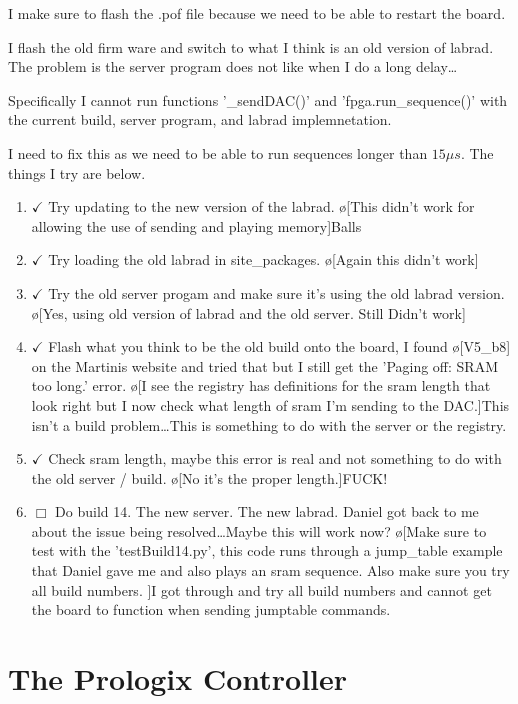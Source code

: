 \documentclass[10pt]{book}
\begin{document}
{I make sure to flash the .pof file because we need to be able to restart the board.

I flash the old firm ware and switch to what I think is an old version of labrad. The problem is the server program does not like when I do a long delay\ldots

Specifically I cannot run functions '\_sendDAC()' and 'fpga.run\_sequence()' with the current build, server program, and labrad implemnetation. 

I need to fix this as we need to be able to run sequences longer than $15 \mu s$. The things I try are below.
\begin{enumerate}
    \item $\checkmark$ Try updating to the new version of the labrad. \o[This didn't work for allowing the use of sending and playing memory]{Balls}
    \item $\checkmark$ Try loading the old labrad in site_packages. \o[Again this didn't work]{}
    \item $\checkmark$ Try the old server progam and make sure it's using the old labrad version. \o[Yes, using old version of labrad and the old server. Still Didn't work]{}
    \item $\checkmark$ Flash what you think to be the old build onto the board, I found \o[V5_b8]{} on the Martinis website and tried that but I still get the 'Paging off: SRAM too long.' error. \o[I see the registry has definitions for the sram length that look right but I now check what length of sram I'm sending to the DAC.]{This isn't a build problem\ldots This is something to do with the server or the registry.}
    \item $\checkmark$ Check sram length, maybe this error is real and not something to do with the old server / build. \o[No it's the proper length.]{FUCK!}
    \item $\Box$ Do build 14. The new server. The new labrad. Daniel got back to me about the issue being resolved\ldots Maybe this will work now? \o[Make sure to test with the 'testBuild14.py', this code runs through a jump\_table example that Daniel gave me and also plays an sram sequence. Also make sure you try all build numbers. ]{I got through and try all build numbers and cannot get the board to function when sending jumptable commands.}
\end{enumerate}


\chapter{The Prologix Controller}

}
\end{document}
